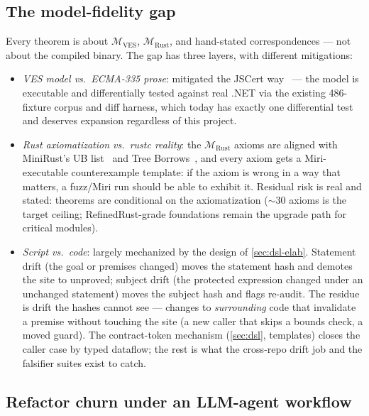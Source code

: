 \subsection{The model-fidelity gap}
\label{sec:risks-fidelity}

Every theorem is about $\mathcal{M}_{\mathrm{VES}}$,
$\mathcal{M}_{\mathrm{Rust}}$, and hand-stated correspondences --- not
about the compiled binary. The gap has three layers, with different
mitigations:

\begin{itemize}[leftmargin=1.4em]
\item \emph{VES model vs.\ ECMA-335 prose}: mitigated the JSCert
  way~\cite{jscert2014} --- the model is executable and differentially
  tested against real .NET via the existing 486-fixture corpus and diff
  harness, which today has exactly one differential test and deserves
  expansion regardless of this project.
\item \emph{Rust axiomatization vs.\ rustc reality}: the
  $\mathcal{M}_{\mathrm{Rust}}$ axioms are aligned with MiniRust's UB
  list~\cite{minirust} and Tree Borrows~\cite{treeborrows2025}, and
  every axiom gets a Miri-executable counterexample template: if the
  axiom is wrong in a way that matters, a fuzz/Miri run should be able
  to exhibit it. Residual risk is real and stated: theorems are
  conditional on the axiomatization ($\sim$30 axioms is the target
  ceiling; RefinedRust-grade foundations remain the upgrade path for
  critical modules).
\item \emph{Script vs.\ code}: largely mechanized by the design of
  \cref{sec:dsl-elab}. Statement drift (the goal or premises changed)
  moves the statement hash and demotes the site to unproved; subject
  drift (the protected expression changed under an unchanged
  statement) moves the subject hash and flags re-audit. The residue
  is drift the hashes cannot see --- changes to \emph{surrounding}
  code that invalidate a premise without touching the site (a new
  caller that skips a bounds check, a moved guard). The contract-token
  mechanism (\cref{sec:dsl}, templates) closes the caller case by
  typed dataflow; the rest is what the cross-repo drift job and the
  falsifier suites exist to catch.
\end{itemize}

\subsection{Refactor churn under an LLM-agent workflow}
\label{sec:risks-churn}

